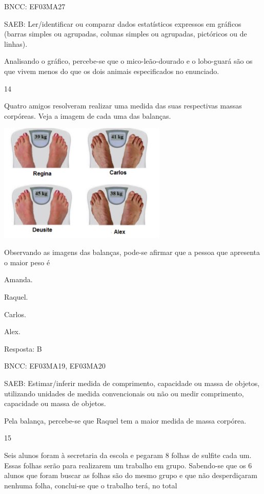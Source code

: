 \begin{escolha}
{\begin{escolha}
{BNCC: EF03MA27

SAEB: Ler/identificar ou comparar dados estatísticos
expressos em gráficos (barras simples ou agrupadas, colunas simples ou
agrupadas, pictóricos ou de linhas).

Analisando o gráfico, percebe-se que o mico-leão-dourado e o lobo-guará
são os que vivem menos do que os dois animais especificados no enunciado.

\num{14}

Quatro amigos resolveram realizar uma medida das suas respectivas massas
corpóreas. Veja a imagem de cada uma das balanças.


\includegraphics[width=3.15196in,height=2.22201in]{media/image128.png}

Observando as imagens das balanças, pode-se afirmar que a pessoa que apresenta o maior peso é

\begin{escolha}

\item
  Amanda.
\item
  Raquel.
\item
  Carlos.
\item
  Alex.
\end{escolha}

Resposta: B

BNCC: EF03MA19, EF03MA20

SAEB: Estimar/inferir medida de comprimento, capacidade ou
massa de objetos, utilizando unidades de medida convencionais ou não ou
medir comprimento, capacidade ou massa de objetos.

Pela balança, percebe-se que Raquel tem a maior medida de massa corpórea.

\num{15}

Seis alunos foram à secretaria da escola e pegaram 8 folhas de sulfite
cada um. Essas folhas serão para realizarem um trabalho em grupo.
Sabendo-se que os 6 alunos que foram buscar as folhas são do mesmo grupo
e que não desperdiçaram nenhuma folha, conclui-se que o trabalho terá, no total

}
\end{escolha}}
\end{escolha}
